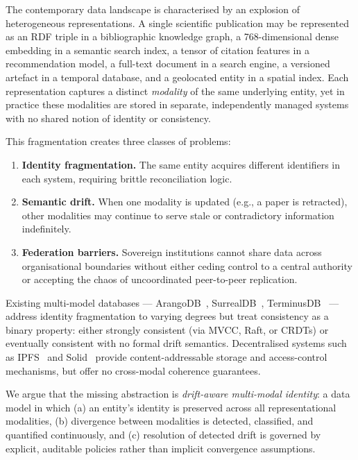 \documentclass[11pt,twocolumn]{article}
\begin{document}
The contemporary data landscape is characterised by an explosion of
heterogeneous representations.  A single scientific publication may be
represented as an RDF triple in a bibliographic knowledge graph, a 768-dimensional
dense embedding in a semantic search index, a tensor of citation features in a
recommendation model, a full-text document in a search engine, a versioned
artefact in a temporal database, and a geolocated entity in a spatial index.
Each representation captures a distinct \emph{modality} of the same underlying
entity, yet in practice these modalities are stored in separate, independently
managed systems with no shared notion of identity or consistency.

This fragmentation creates three classes of problems:

\begin{enumerate}[leftmargin=*]
  \item \textbf{Identity fragmentation.}  The same entity acquires different
    identifiers in each system, requiring brittle reconciliation logic.
  \item \textbf{Semantic drift.}  When one modality is updated (e.g., a
    paper is retracted), other modalities may continue to serve stale or
    contradictory information indefinitely.
  \item \textbf{Federation barriers.}  Sovereign institutions cannot share
    data across organisational boundaries without either ceding control to a
    central authority or accepting the chaos of uncoordinated peer-to-peer
    replication.
\end{enumerate}

Existing multi-model databases --- ArangoDB~\cite{arangodb2023}, SurrealDB~\cite{surrealdb2024},
TerminusDB~\cite{terminusdb2023} --- address identity fragmentation to varying
degrees but treat consistency as a binary property: either strongly consistent
(via MVCC, Raft, or CRDTs) or eventually consistent with no formal drift
semantics.  Decentralised systems such as IPFS~\cite{benet2014ipfs} and
Solid~\cite{sambra2016solid} provide content-addressable storage and
access-control mechanisms, but offer no cross-modal coherence guarantees.

We argue that the missing abstraction is \emph{drift-aware multi-modal
identity}: a data model in which (a) an entity's identity is preserved across
all representational modalities, (b) divergence between modalities is detected,
classified, and quantified continuously, and (c) resolution of detected drift is
governed by explicit, auditable policies rather than implicit convergence
assumptions.
\end{document}
